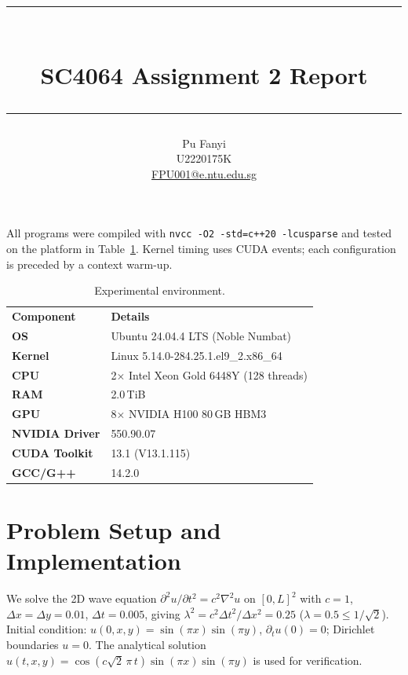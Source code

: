 \documentclass[11pt,a4paper]{article}
\title{%
  \vspace{-1.8cm}%
  {\color{accent}\rule{\textwidth}{2pt}}\\[0.6em]%
  {\LARGE\bfseries\color{accent} SC4064 Assignment 2 Report}\\[0.4em]%
  {\color{accent}\rule{\textwidth}{0.8pt}}%
}
\author{Pu Fanyi \\ U2220175K \\ \href{mailto:FPU001@e.ntu.edu.sg}{FPU001@e.ntu.edu.sg}}
\date{}
\newcommand{\thead}[1]{\textbf{\color{white}#1}}
\newcommand{\code}[1]{\texttt{\small\colorbox{codebg}{#1}}}
\begin{document}
\maketitle
\thispagestyle{fancy}
\vspace{-0.6cm}

All programs were compiled with \code{nvcc -O2 -std=c++20 -lcusparse} and tested on the platform in Table~\ref{tab:env}. Kernel timing uses CUDA events; each configuration is preceded by a context warm-up.

\begin{table}[h]
\centering\small
\setlength{\tabcolsep}{10pt}
\begin{tabular}{>{\bfseries\color{accent}}l l}
\rowcolor{tableheader}
\thead{Component} & \thead{Details} \\
\rowcolor{tablerow} OS             & Ubuntu 24.04.4 LTS (Noble Numbat) \\
                    Kernel         & Linux 5.14.0-284.25.1.el9\_2.x86\_64 \\
\rowcolor{tablerow} CPU            & 2$\times$ Intel Xeon Gold 6448Y (128 threads) \\
                    RAM            & 2.0\,TiB \\
\rowcolor{tablerow} GPU            & 8$\times$ NVIDIA H100 80\,GB HBM3 \\
                    NVIDIA Driver  & 550.90.07 \\
\rowcolor{tablerow} CUDA Toolkit   & 13.1 (V13.1.115) \\
                    GCC/G++        & 14.2.0 \\
\end{tabular}
\vspace{-0.3em}
\caption{Experimental environment.}
\label{tab:env}
\end{table}
\vspace{-0.4cm}

\section{Problem Setup and Implementation}

We solve the 2D wave equation $\partial^2 u/\partial t^2 = c^2 \nabla^2 u$ on $[0,L]^2$ with $c=1$, $\Delta x = \Delta y = 0.01$, $\Delta t = 0.005$, giving $\lambda^2 = c^2 \Delta t^2 / \Delta x^2 = 0.25$ ($\lambda = 0.5 \le 1/\sqrt{2}$). Initial condition: $u(0,x,y) = \sin(\pi x)\sin(\pi y)$, $\partial_t u(0) = 0$; Dirichlet boundaries $u = 0$. The analytical solution $u(t,x,y) = \cos(c\sqrt{2}\,\pi\,t)\sin(\pi x)\sin(\pi y)$ is used for verification.
\end{document}

